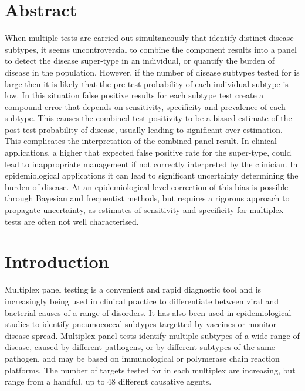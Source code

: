 \documentclass[10pt,letterpaper]{article}
\begin{document}
\section*{Abstract}
When multiple tests are carried out simultaneously that identify distinct disease subtypes, it seems uncontroversial to combine the component results into a panel to detect the disease super-type in an individual, or quantify the burden of disease in the population. However, if the number of disease subtypes tested for is large then it is likely that the pre-test probability of each individual subtype is low. In this situation false positive results for each subtype test create a compound error that depends on sensitivity, specificity and prevalence of each subtype. This causes the combined test positivity to be a biased estimate of the post-test probability of disease, usually leading to significant over estimation. This complicates the interpretation of the combined panel result. In clinical applications, a higher that expected false positive rate for the super-type, could lead to inappropriate management if not correctly interpreted by the clinician. In epidemiological applications it can lead to significant uncertainty determining the burden of disease. At an epidemiological level correction of this bias is possible through Bayesian and frequentist methods, but requires a rigorous approach to propagate uncertainty, as estimates of sensitivity and specificity for multiplex tests are often not well characterised.


\linenumbers

\section*{Introduction}

Multiplex panel testing is a convenient and rapid diagnostic tool and is increasingly being used in clinical practice to differentiate between viral and bacterial causes of a range of disorders\cite{ramanan2017}. It has also been used in epidemiological studies to identify pneumococcal subtypes targetted by vaccines\cite{bonten2015} or monitor disease spread\cite{henson2023}. Multiplex panel tests identify multiple subtypes of a wide range of disease, caused by different pathogens, or by different subtypes of the same pathogen\cite{ramanan2017}, and may be based on immunological\cite{pride2012,kalina2020} or polymerase chain reaction platforms\cite{mengelle2013,murphy2020,jaaskelainen2006,jansen2011,grondahl1999,hendolin1997}. The number of targets tested for in each multiplex are increasing, but range from a handful, up to 48 different causative agents\cite{henson2023}.
\end{document}
